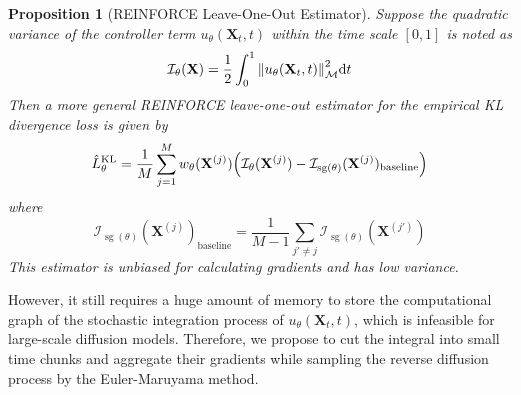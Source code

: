 \documentclass{article}
\theoremstyle{plain}
\newtheorem{proposition}[theorem]{Proposition}
\theoremstyle{definition}
\theoremstyle{remark}
\DeclareMathOperator{\sg}{\mathrm{sg}}
\begin{document}
\begin{proposition}[REINFORCE Leave-One-Out Estimator]\label{prop:rloo}
    Suppose the quadratic variance of the controller term $u_\theta(\mathbf{X}_t, t)$ within the time scale $[0, 1]$ is noted as
    \begin{equation}
        \label{eq:quadratic_variance}
        \mathcal{I}_\theta(\mathbf{X}) = \frac{1}{2}\int_0^1 \norm{u_\theta(\mathbf{X}_t, t)}_\mathcal{M}^2 \dd t
    \end{equation}
    Then a more general REINFORCE leave-one-out estimator for the empirical KL divergence loss is given by
    \begin{equation}
        \hat{L}_\theta^\text{KL} = \frac{1}{M} \sum_{j=1}^M w_\theta(\mathbf{X}^{(j)})\qty(\mathcal{I}_\theta(\mathbf{X}^{(j)}) - \mathcal{I}_{\sg(\theta)}(\mathbf{X}^{(j)})_\text{baseline})
    \end{equation}
    where
    \begin{equation}
        \mathcal{I}_{\sg(\theta)}(\mathbf{X}^{(j)})_\text{baseline} = \frac{1}{M-1}\sum_{j'\neq j} \mathcal{I}_{\sg(\theta)}(\mathbf{X}^{(j')})
    \end{equation}
    This estimator is unbiased for calculating gradients and has low variance.
\end{proposition}

However, it still requires a huge amount of memory to store the computational graph of the stochastic integration process of $u_\theta(\mathbf{X}_t, t)$, which is infeasible for large-scale diffusion models. Therefore, we propose to cut the integral into small time chunks and aggregate their gradients while sampling the reverse diffusion process by the Euler-Maruyama method.
\end{document}
